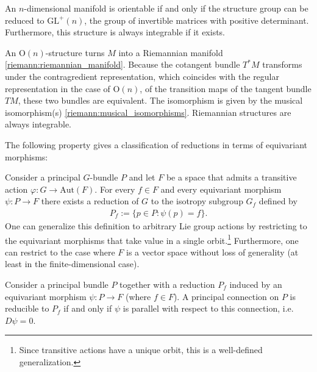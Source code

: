     \begin{example}\label{diff:orientable_structure}
        An $n$-dimensional manifold is orientable if and only if the structure group can be reduced to $\text{GL}^+(n)$, the group of invertible matrices with positive determinant. Furthermore, this structure is always integrable if it exists.
    \end{example}
    \begin{example}\label{diff:riemannian_G_structure}
        An $\text{O}(n)$-structure turns $M$ into a Riemannian manifold \ref{riemann:riemannian_manifold}. Because the cotangent bundle $T^*M$ transforms under the contragredient representation, which coincides with the regular representation in the case of $\text{O}(n)$, of the transition maps of the tangent bundle $TM$, these two bundles are equivalent. The isomorphism is given by the musical isomorphism(s) \ref{riemann:musical_isomorphisms}. Riemannian structures are always integrable.
    \end{example}

    The following property gives a classification of reductions in terms of equivariant morphisms:
    \begin{property}\label{diff:reduction_classification}
        Consider a principal $G$-bundle $P$ and let $F$ be a space that admits a transitive action $\varphi:G\rightarrow\text{Aut}(F)$. For every $f\in F$ and every equivariant morphism $\psi:P\rightarrow F$ there exists a reduction of $G$ to the isotropy subgroup $G_f$ defined by
        \begin{gather}
            P_f := \{p\in P:\psi(p) = f\}.
        \end{gather}
        One can generalize this definition to arbitrary Lie group actions by restricting to the equivariant morphisms that take value in a single orbit.\footnote{Since transitive actions have a unique orbit, this is a well-defined generalization.} Furthermore, one can restrict to the case where $F$ is a vector space without loss of generality (at least in the finite-dimensional case).
    \end{property}

    \begin{property}\label{diff:connection_reducibility}
        Consider a principal bundle $P$ together with a reduction $P_f$ induced by an equivariant morphism $\psi:P\rightarrow F$ (where $f\in F$). A principal connection on $P$ is reducible to $P_f$ if and only if $\psi$ is parallel with respect to this connection, i.e. $D\psi = 0$.
    \end{property}


